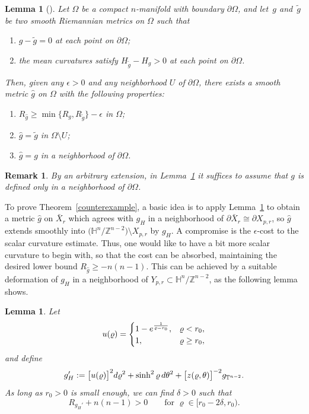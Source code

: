 \documentclass[11pt]{article}
\numberwithin{equation}{section}
\numberwithin{equation}{section}
\newtheorem{Lemma}[Theorem]{Lemma}
\newtheorem{Remark}[Theorem]{Remark} }
\def\H{\mathbb{H}}
\def\T{\mathbb{T}}
\def\Z{\mathbb{Z}}
\def\ed{{\rm d}}
\begin{document}
\begin{Lemma}[{\cite[Theorem 5]{BMN2011}}] \label{bmnthm5}
Let $\Omega$ be a compact $n$-manifold with boundary $\partial\Omega$, and let~$g$ and~$\tilde g$ be two smooth Riemannian metrics on $\Omega$ such that
\begin{enumerate}\itemsep=0pt
\item[$(a)$] $g-\tilde  g=0$ at each point on $\partial\Omega$;
\item[$(b)$] the mean curvatures satisfy $H_{\tilde g}-H_{g}>0$ at each point on $\partial \Omega$.
\end{enumerate}
Then, given any $\epsilon>0$ and any neighborhood $U$ of $\partial \Omega$, there exists a smooth metric $ \hat g$ on $\Omega$ with the following properties:
\begin{enumerate}\itemsep=0pt
    \item[$(1)$] $R_{\hat g} \geq \min\{R_g , R_{\tilde g} \}-\epsilon $ in $\Omega$;
	\item[$(2)$] $\hat g=\tilde g$ in $\Omega\setminus U$;
	\item[$(3)$] $\hat g= g$	in a neighborhood of $\partial\Omega$.
\end{enumerate}
\end{Lemma}
\begin{Remark}
By an arbitrary extension, in Lemma~\ref{bmnthm5} it suffices to assume that $g $ is defined only in a neighborhood of $\partial \Omega$. 	
\end{Remark}

To prove Theorem~\ref{counterexample},
a basic idea is to apply Lemma~\ref{bmnthm5} to obtain a
metric $\hat g$ on $\bar X_r$ which
agrees with $g_H$ in a neighborhood of $\partial \bar X_r\cong \partial X_{p,r}$,
so $\hat g$ extends smoothly into
$\bigl(\H^{n}/\Z^{n-2}\bigr)\setminus X_{p,r}$ by $g_H$.
A compromise is the $\epsilon$-cost to the scalar curvature estimate.
Thus, one would like to have a bit more scalar curvature
to begin with, so that the cost can be absorbed, maintaining the
desired lower bound $R_{\hat g}\ge -n(n-1)$.
This can be achieved by a suitable deformation of
$g_H$ in a neighborhood of $Y_{p,r}\subset \H^{n}/\Z^{n-2}$, as the following lemma
shows.


\begin{Lemma}\label{tradeoffLemma}
Let
\begin{equation}
u(\varrho)=
		\begin{cases}
			1-{\rm e}^{\frac{1}{\varrho-r_0}},& \varrho< r_0, \\
		    1, & \varrho\geq r_0,
		\end{cases}
\end{equation}
and define
\begin{equation*}%
g_{H}':=\bigl[u(\varrho)\bigr]^2\ed\varrho^2 +\sinh^2 \varrho\, \ed\theta^2 +\bigl[z(\varrho,\theta)\bigr]^{-2} g_{\T^{n-2}}.
\end{equation*}
As long as $r_0>0$ is small enough, we can find $\delta>0$ such that
\[
	R_{g_{H}'} + n(n-1)  >0\qquad \mbox{for }
 \varrho \in [r_0-2\delta, r_0).
\]
\end{Lemma}
\end{document}
